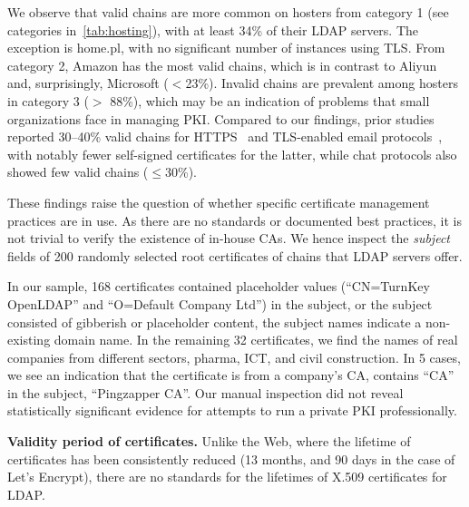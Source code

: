 We observe that valid chains are more common on hosters from category 1 (see categories in~\ref{tab:hosting}), with at least 34\% of their \gls{LDAP} servers. The exception is home.pl, with no significant number of instances using \gls{TLS}. From category 2, Amazon has the most valid chains, which is in contrast to Aliyun and, surprisingly, Microsoft ($<$23\%). Invalid chains are prevalent among hosters in category 3 ($>$ 88\%), which may be an indication of problems that small organizations face in managing PKI.
Compared to our findings, prior studies reported 30–40\% valid chains for HTTPS~\cite{10.1145/2504730.2504755} and \gls{TLS}-enabled email protocols~\cite{holz2016}, with notably fewer self-signed certificates for the latter, while chat protocols also showed few valid chains ($\le$30\%).

These findings raise the question of whether specific certificate management practices are in use. As there are no standards or documented best practices, it is not trivial to verify the existence of in-house CAs. We hence inspect the \textit{subject} fields of 200 randomly selected root certificates of chains that \gls{LDAP} servers offer.

In our sample, 168 certificates contained placeholder values (\eg ``CN=TurnKey OpenLDAP'' and ``O=Default Company Ltd'') in the subject, or the subject consisted of gibberish or placeholder content, \ie the subject names indicate a non-existing domain name. In the remaining 32 certificates, we find the names of real companies from different sectors, \eg pharma, ICT, and civil construction.
In 5 cases, we see an indication that the certificate is from a company's CA, \ie contains ``CA'' in the subject, \eg ``Pingzapper CA''. Our manual inspection did not reveal statistically significant evidence for attempts to run a private PKI professionally.

\textbf{Validity period of certificates.}
Unlike the Web, where the lifetime of certificates has been consistently reduced (13 months, and 90 days in the case of Let's Encrypt), there are no standards for the lifetimes of X.509 certificates for \gls{LDAP}.

